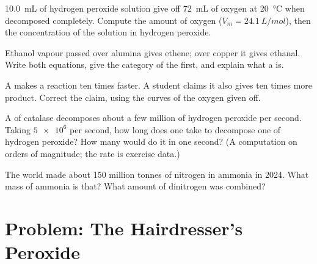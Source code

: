 \begin{exercise}[$\star\star$]\label{exo:g12:catalysis:11}
\qty{10.0}{mL} of hydrogen peroxide solution give off \qty{72}{mL} of
oxygen at \qty{20}{\celsius} when decomposed completely. Compute the
amount of oxygen ($V_m = \qty{24.1}{L/mol}$), then the concentration of
the solution in hydrogen peroxide.
\end{exercise}

\begin{exercise}[$\star\star\star$]\label{exo:g12:catalysis:12}
Ethanol vapour passed over alumina gives ethene; over copper it gives
ethanal. Write both equations, give the category of the first, and
explain what a  is.
\end{exercise}

\begin{exercise}[$\star\star\star$]\label{exo:g12:catalysis:13}
A  makes a reaction ten times faster. A student claims it also
gives ten times more product. Correct the claim, using the curves of the
oxygen given off.
\end{exercise}

\begin{exercise}[$\star\star\star$]\label{exo:g12:catalysis:14}
A  of catalase decomposes about a few million  of
hydrogen peroxide per second. Taking $\num{5e6}$ per second, how long
does one   take to decompose one  of hydrogen peroxide?
How many   would do it in one second? (A computation on
orders of magnitude; the rate is exercise data.)
\end{exercise}

\begin{exercise}[$\star\star\star$]\label{exo:g12:catalysis:15}
The world made about 150 million tonnes of nitrogen in ammonia in 2024.
What mass of ammonia is that? What amount of dinitrogen was combined?
\end{exercise}

\section{Problem: The Hairdresser's Peroxide}

